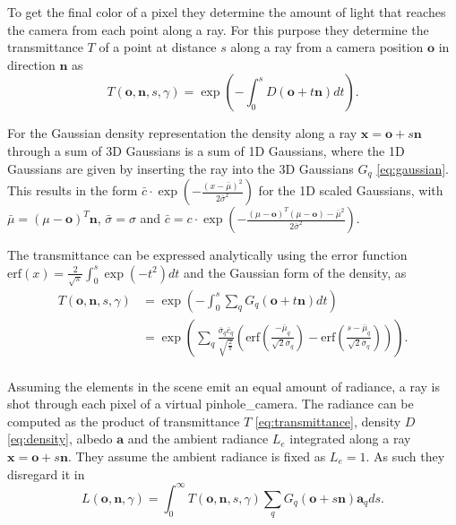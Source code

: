 \documentclass[a4paper, 11pt]{memoir}
\newcommand*{\erf}{\text{erf}}
\begin{document}
    To get the final color of a pixel they determine the amount of light that reaches the camera from each point
    along a ray. For this purpose they determine the \gls{transmittance} $T$ of a point at distance $s$ along a ray from
    a camera position $\mathbf{o}$ in direction $\mathbf{n}$ as
    \begin{equation}
        T(\mathbf{o}, \mathbf{n}, s, \gamma) = \exp{\left( - \int_0^s D(\mathbf{o} + t\mathbf{n}) dt \right)}.
        \label{eq:transmittance}
    \end{equation}

    For the Gaussian density representation the density along a ray $\mathbf{x} = \mathbf{o} + s\mathbf{n}$ through a
    sum of 3D Gaussians is a sum of 1D Gaussians, where the 1D Gaussians are given by inserting the ray into the
    3D Gaussians $G_q$ \eqref{eq:gaussian}. This results in the form
    $\bar{c} \cdot \exp{\left( - \frac{(x - \bar{\mu})^2}{2\bar{\sigma}^2} \right)}$ for the 1D scaled Gaussians, with
    $\bar{\mu} = (\mu - \mathbf{o})^T\mathbf{n}$, $\bar{\sigma} = \sigma$ and
    $\bar{c} = c \cdot \exp{\left( - \frac{(\mu - \mathbf{o})^T(\mu - \mathbf{o}) - \bar{\mu}^2}{2\bar{\sigma}^2} \right)}$.

    The \gls{transmittance} can be expressed analytically using the error function
    $\erf{(x)} = \frac{2}{\sqrt{\pi}}\int_0^s \exp{(-t^2)} dt$ and the Gaussian form of the density, as
    \begin{equation}
        \begin{aligned}
            T(\mathbf{o}, \mathbf{n}, s, \gamma) &= \exp{\left( -\int_0^s
                \sum_q G_q(\mathbf{o} + t\mathbf{n} ) dt \right)}\\
            &= \exp{\left( \sum_q \frac{\bar{\sigma}_q \bar{c}_q}{\sqrt{\frac{2}{\pi}}}
            \left( \erf{\left( \frac{-\bar{\mu}_q}{\sqrt{2}\bar{\sigma}_q} \right)}
            - \erf{\left( \frac{s - \bar{\mu}_q}{\sqrt{2}\bar{\sigma}_q} \right)} \right) \right)}.\\
        \end{aligned}
        \label{eq:transmittance_analytical}
    \end{equation}

    Assuming the elements in the scene emit an equal amount of \gls{radiance}, a ray is shot through each pixel of a virtual
    \gls{pinhole_camera}. The \gls{radiance} can be computed as the product of \gls{transmittance} $T$ \eqref{eq:transmittance},
    density $D$ \eqref{eq:density}, \gls{albedo} $\mathbf{a}$ and the ambient \gls{radiance} $L_e$ integrated along a ray
    $\mathbf{x} = \mathbf{o} + s\mathbf{n}$. They assume the ambient \gls{radiance} is fixed as $L_e = 1$. As such they
    disregard it in
    \begin{equation}
        L(\mathbf{o}, \mathbf{n}, \gamma) = \int_0^\infty T(\mathbf{o}, \mathbf{n}, s, \gamma)
            \sum_q G_q(\mathbf{o} + s\mathbf{n})\mathbf{a}_q ds.
    \end{equation}
    
\end{document}
